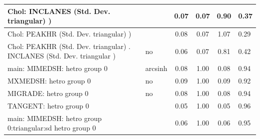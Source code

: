\begin{table}
\begin{center}
\begin{tabular}{|l|l|c|c|c|l|}
			 Chol: INCLANES (Std. Dev. triangular) ) &  & 0.07 & 0.07 & 0.90 & 0.37 \\
			\hline
			 Chol: PEAKHR (Std. Dev. triangular) ) &  & 0.08 & 0.07 & 1.07 & 0.29 \\
			\hline
			 Chol: PEAKHR (Std. Dev. triangular) . INCLANES (Std. Dev.   triangular ) & no & 0.06 & 0.07 & 0.81 & 0.42 \\
			\hline
			main: MIMEDSH: hetro group 0 & arcsinh & 0.08 & 1.00 & 0.08 & 0.94 \\
			\hline
			MXMEDSH: hetro group 0 & no & 0.09 & 1.00 & 0.09 & 0.92 \\
			\hline
			MIGRADE: hetro group 0 & no & 0.08 & 1.00 & 0.08 & 0.94 \\
			\hline
			TANGENT: hetro group 0 &  & 0.05 & 1.00 & 0.05 & 0.96 \\
			\hline
			main: MIMEDSH: hetro group 0:triangular:sd  hetro group 0 &  & 0.06 & 1.00 & 0.06 & 0.95 \\
			\hline
		\end{tabular}
	\end{center}
\end{table}